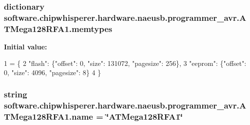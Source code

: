 \subsubsection[{memtypes}]{\setlength{\rightskip}{0pt plus 5cm}dictionary software.\+chipwhisperer.\+hardware.\+naeusb.\+programmer\+\_\+avr.\+A\+T\+Mega128\+R\+F\+A1.\+memtypes\hspace{0.3cm}{\ttfamily [static]}}\label{classsoftware_1_1chipwhisperer_1_1hardware_1_1naeusb_1_1programmer__avr_1_1ATMega128RFA1_ad2aa25493c0ae1f5d1786c7f61adb5a2}
{\bfseries Initial value\+:}
\begin{DoxyCode}
1 = \{
2             \textcolor{stringliteral}{"flash"}: \{\textcolor{stringliteral}{"offset"}: 0, \textcolor{stringliteral}{"size"}: 131072, \textcolor{stringliteral}{"pagesize"}: 256\},
3             \textcolor{stringliteral}{"eeprom"}: \{\textcolor{stringliteral}{"offset"}: 0, \textcolor{stringliteral}{"size"}: 4096, \textcolor{stringliteral}{"pagesize"}: 8\}
4         \}
\end{DoxyCode}
\hypertarget{classsoftware_1_1chipwhisperer_1_1hardware_1_1naeusb_1_1programmer__avr_1_1ATMega128RFA1_a49dad48786d592e3fae8ea19308bf9bf}{}
\subsubsection[{name}]{\setlength{\rightskip}{0pt plus 5cm}string software.\+chipwhisperer.\+hardware.\+naeusb.\+programmer\+\_\+avr.\+A\+T\+Mega128\+R\+F\+A1.\+name = \char`\"{}A\+T\+Mega128\+R\+F\+A1\char`\"{}\hspace{0.3cm}{\ttfamily [static]}}\label{classsoftware_1_1chipwhisperer_1_1hardware_1_1naeusb_1_1programmer__avr_1_1ATMega128RFA1_a49dad48786d592e3fae8ea19308bf9bf}
\hypertarget{classsoftware_1_1chipwhisperer_1_1hardware_1_1naeusb_1_1programmer__avr_1_1ATMega128RFA1_abd6cd5dd1d8d4f3cbb5c0741caef967d}{}
